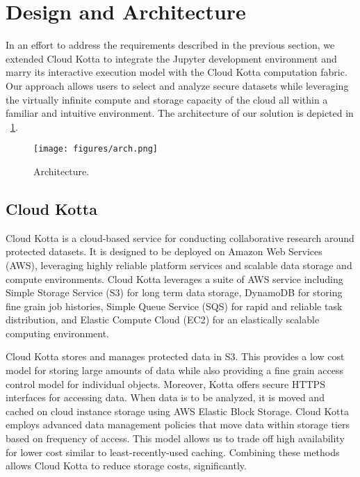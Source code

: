 \section{Design and Architecture}


In an effort to address the requirements described in the previous section, we extended Cloud Kotta to integrate the Jupyter development environment and marry its interactive
execution model with the Cloud Kotta computation fabric. Our approach allows users to select
and analyze secure datasets while leveraging the virtually 
infinite compute and storage capacity of the cloud all within a familiar and intuitive environment. 
The architecture of our solution is depicted in \figurename~\ref{fig:arch}.

\begin{figure}
  \center
  \texttt{[image: figures/arch.png]}
  \caption{Architecture.}
  \label{fig:arch}
  \vspace{-1.5em}
\end{figure}

\subsection{Cloud Kotta}
Cloud Kotta is a cloud-based service for conducting collaborative research around protected datasets.
It is designed to be deployed on Amazon Web Services (AWS), leveraging highly reliable
platform services and scalable data storage and compute environments. 
Cloud Kotta leverages a suite of AWS service including 
Simple Storage Service (S3) for long term data storage, 
DynamoDB for storing fine grain job histories, 
Simple Queue Service (SQS) for rapid and reliable task distribution,
and Elastic Compute Cloud (EC2) for an elastically scalable computing environment.

Cloud Kotta stores and manages protected data in S3. This provides a
low cost model for storing large amounts of data while also providing
a fine grain access control model for individual objects. Moreover, Kotta offers
secure HTTPS interfaces for accessing data. 
When data is to be analyzed, it is moved and cached on cloud instance storage
using AWS Elastic Block Storage.
Cloud Kotta employs advanced data management policies that move data within storage 
tiers based on frequency of access. This model allows us to trade off
high availability for lower cost similar to least-recently-used caching. 
Combining these methods allows Cloud Kotta to reduce storage costs, significantly.

